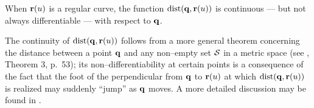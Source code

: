 
\begin{propn}
When ${\bf r}(u)$ is a regular curve, the function ${\rm dist}({\bf q},
{\bf r}(u))$ is continuous --- but not always differentiable ---
with respect to ${\bf q}$.
\end{propn}

\prf The continuity of ${\rm dist}({\bf q},{\bf r}(u))$ follows from
a more general theorem concerning the distance between a point
${\bf q}$ and any non--empty set ${\cal S}$ in a metric space (see
\cite{kelly79}, Theorem 3, p.~53); its non--differentiability at
certain points is a consequence of the fact that the foot of the
perpendicular from ${\bf q}$ to ${\bf r}(u)$ at which ${\rm dist}({\bf q},
{\bf r}(u))$ is realized may suddenly ``jump'' as ${\bf q}$ moves.
A more detailed discussion may be found in \cite{farouki91}. \QED




